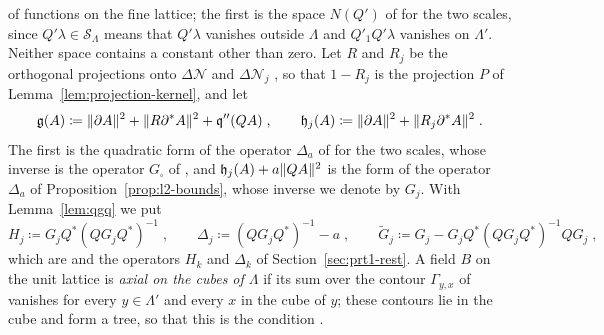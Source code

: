 \documentclass[11pt]{preprint}
\DeclarePairedDelimiter{\norm}{\lVert}{\rVert}
\numberwithin{equation}{section}
\theoremstyle{definition}
\theoremstyle{remark}
\theoremstyle{plain}
\begin{document}
of functions on the fine lattice; the first is the space $N(Q')$ of \cite[(2.10)]{BalabanPRT2} for the two scales, since $Q'\lambda \in \mathcal S_\Lambda$ means that $Q'\lambda$ vanishes outside $\Lambda$ and $Q'_1Q'\lambda$ vanishes on $\Lambda'$. Neither space contains a constant other than zero. Let $R$ and $R_j$ be the orthogonal projections onto $\Delta\mathcal N$ and $\Delta\mathcal N_j$ \cite[p.~225]{BalabanPRT2}, so that $1 - R_j$ is the projection $P$ of Lemma~\ref{lem:projection-kernel}, and let
\begin{equation}\label{eq:two-scale-forms}
    \mathfrak g(A) \coloneqq \norm{\partial A}^2 + \norm{R\partial^*A}^2 + \mathfrak q''(QA)\;,
    \qquad
    \mathfrak h_j(A) \coloneqq \norm{\partial A}^2 + \norm{R_j\partial^*A}^2\;.
\end{equation}
The first is the quadratic form of the operator $\Delta_a$ of \cite[(2.19)]{BalabanPRT2} for the two scales, whose inverse is the operator $G_\square$ of \cite[(2.90)]{BalabanPRT2}, and $\mathfrak h_j(A) + a\norm{QA}^2$ is the form of the operator $\Delta_a$ of Proposition~\ref{prop:l2-bounds}, whose inverse we denote by $G_j$. With Lemma~\ref{lem:qgq} we put
\begin{equation}\label{eq:one-scale-operators}
    H_j \coloneqq G_jQ^*(QG_jQ^*)^{-1}\;,
    \qquad
    \Delta_j \coloneqq (QG_jQ^*)^{-1} - a\;,
    \qquad
    \tilde G_j \coloneqq G_j - G_jQ^*(QG_jQ^*)^{-1}QG_j\;,
\end{equation}
which are \cite[(2.130), (2.131)]{BalabanPRT2} and the operators $H_k$ and $\Delta_k$ of Section~\ref{sec:prt1-rest}. A field $B$ on the unit lattice is \emph{axial on the cubes of $\Lambda$} if its sum over the contour $\Gamma_{y,x}$ of \cite[(1.7)]{BalabanPRT1} vanishes for every $y \in \Lambda'$ and every $x$ in the cube of $y$; these contours lie in the cube and form a tree, so that this is the condition \cite[(2.121)]{BalabanPRT2}.
\end{document}
